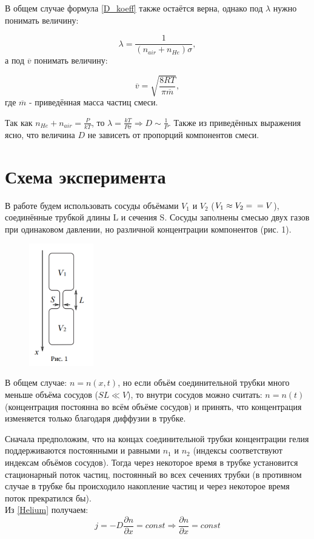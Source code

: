 \documentclass[15pt,a5paper,reqno]{article}
\begin{document}
	В общем случае формула \eqref{D_koeff} также остаётся верна, однако под $\lambda$ нужно понимать величину:
	
	\[\lambda = \frac{1}{(n_{air} + n_{He})\sigma},\]
	а под $\overline{v}$ понимать величину:
	
	\[\overline{v} = \sqrt{\frac{8RT}{\pi\overline{m}}},\]
	где $\overline{m}$ - приведённая масса частиц смеси.
	
	Так как $n_{He} + n_{air} = \frac{P}{kT}$, то $\lambda = \frac{kT}{P\sigma} \Rightarrow D \sim \frac{1}{P}$. Также из приведённых выражения ясно, что величина $D$ не зависеть от пропорций компонентов смеси.
	
\section{Схема эксперимента}
	
	В работе будем использовать сосуды объёмами $V_1$ и $V_2$ ($V_1 \approx V_2 =\\= V$), соединённые трубкой длины L и сечения S. Сосуды заполнены смесью двух газов при одинаковом давлении, но различной концентрации компонентов (рис. 1).
	
	\begin{figure}
        \centering
        \includegraphics[width=0.25\textwidth]{Рисунок 1.PNG}
    \end{figure}
	
	В общем случае: $n = n(x, t)$, но если объём соединительной трубки много меньше объёма сосудов ($SL \ll V$), то внутри сосудов можно считать: $n = n(t)$ (концентрация постоянна во всём объёме сосудов) и принять, что концентрация изменяется только благодаря диффузии в трубке.
	
	Сначала предположим, что на концах соединительной трубки концентрации гелия поддерживаются постоянными и равными $n_1$ и $n_2$ (индексы соответствуют индексам объёмов сосудов). Тогда через некоторое время в трубке установится стационарный поток частиц, постоянный во всех сечениях трубки (в противном случае в трубке бы происходило накопление частиц и через некоторое время поток прекратился бы).\\
	Из \eqref{Helium} получаем: 
	\[j = -D\frac{\partial n}{\partial x} = const \Rightarrow \frac{\partial n}{\partial x} = const\]
	
\end{document}
